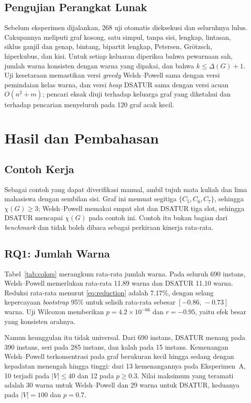 \documentclass[conference,a4paper]{IEEEtran}
\begin{document}
\subsection{Pengujian Perangkat Lunak}
Sebelum eksperimen dijalankan, 268 uji otomatis dieksekusi dan seluruhnya
lulus. Cakupannya meliputi graf kosong, satu simpul, tanpa sisi, lengkap,
lintasan, siklus ganjil dan genap, bintang, bipartit lengkap, Petersen,
Gr\"otzsch, hiperkubus, dan kisi. Untuk setiap keluaran diperiksa bahwa
pewarnaan sah, jumlah warna konsisten dengan warna yang dipakai, dan bahwa
$k\le\Delta(G)+1$. Uji kesetaraan memastikan
versi \emph{greedy} Welsh--Powell sama dengan versi pemindaian kelas warna, dan
versi \emph{heap} DSATUR sama dengan versi acuan $O(n^2+m)$; pencari eksak diuji
terhadap keluarga graf yang diketahui dan terhadap pencarian menyeluruh pada 120
graf acak kecil.

\section{Hasil dan Pembahasan}
\label{sec:results}

\subsection{Contoh Kerja}
Sebagai contoh yang dapat diverifikasi manual, ambil tujuh mata kuliah dan lima
mahasiswa dengan sembilan sisi. Graf ini memuat segitiga $\{C_5,C_6,C_7\}$,
sehingga $\chi(G)\ge 3$; Welsh--Powell memakai empat slot dan DSATUR tiga slot,
sehingga DSATUR mencapai $\chi(G)$ pada contoh ini. Contoh itu bukan bagian dari
\emph{benchmark} dan tidak boleh dibaca sebagai perkiraan kinerja rata-rata.

\subsection{RQ1: Jumlah Warna}
Tabel~\ref{tab:colors} merangkum rata-rata jumlah warna. Pada seluruh 690
instans, Welsh--Powell memerlukan rata-rata 11.89 warna dan DSATUR 11.10 warna.
Reduksi rata-rata menurut \eqref{eq:reduction} adalah 7.17\%, dengan selang
kepercayaan \emph{bootstrap} 95\% untuk selisih rata-rata sebesar
$[-0.86,\,-0.73]$ warna. Uji Wilcoxon memberikan $p=4.2\times10^{-66}$ dan
$r=-0.95$, yaitu efek besar yang konsisten arahnya.



Namun keunggulan itu tidak universal. Dari 690 instans, DSATUR menang pada 390
instans, seri pada 285 instans, dan kalah pada 15 instans. Kemenangan
Welsh--Powell terkonsentrasi pada graf
berukuran kecil hingga sedang dengan kepadatan menengah hingga tinggi: dari 13
kemenangannya pada Eksperimen~A, 10 terjadi pada $|V|\le 40$ dan 12 pada
$p\ge 0.3$. Nilai maksimum yang teramati adalah 30 warna untuk Welsh--Powell
dan 29 warna untuk DSATUR, keduanya pada $|V|=100$ dan $p=0.7$.
\end{document}
